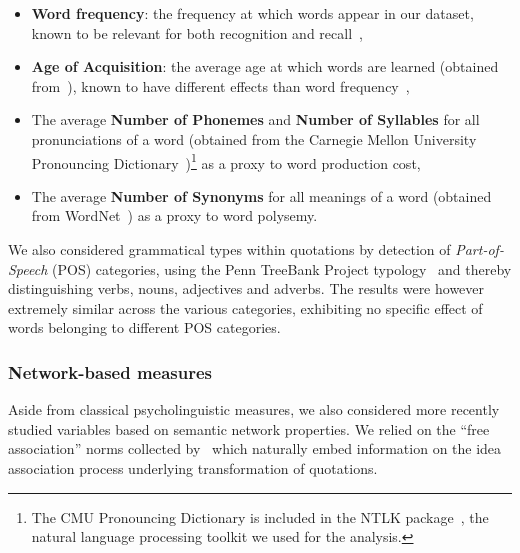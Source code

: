 \begin{itemize}
    \item \textbf{Word frequency}: the frequency at which words appear in our dataset, known to be relevant for both recognition and recall~\citep{gregg1976word},
    \item \textbf{Age of Acquisition}: the average age at which words are learned (obtained from~\citet{kuperman12}), known to have different effects than word frequency~\citep{morrison1995roles,dewhurst1998separate},
    \item The average \textbf{Number of Phonemes} and \textbf{Number of Syllables} for all pronunciations of a word (obtained from the Carnegie Mellon University Pronouncing Dictionary~\citep{Weide98})\footnote{The CMU Pronouncing Dictionary is included in the NTLK package~\citep{Bird09}, the natural language processing toolkit we used for the analysis.} as a proxy to word production cost,
    \item The average \textbf{Number of Synonyms} for all meanings of a word (obtained from WordNet~\citep{WordNet10}) as a proxy to word polysemy.
\end{itemize}

We also considered grammatical types within quotations by detection of \emph{Part-of-Speech} (POS) categories, using the Penn TreeBank Project typology~\citep{Santorini90} and thereby distinguishing verbs, nouns, adjectives and adverbs.
The results were however extremely similar across the various categories, exhibiting no specific effect of words belonging to different POS categories.

\subsubsection{Network-based measures}

Aside from classical psycholinguistic measures, we also considered more recently studied variables based on semantic network properties.
We relied on the ``free association'' norms collected by~\citet{Nelson04} which naturally embed information on the idea association process underlying transformation of quotations.

